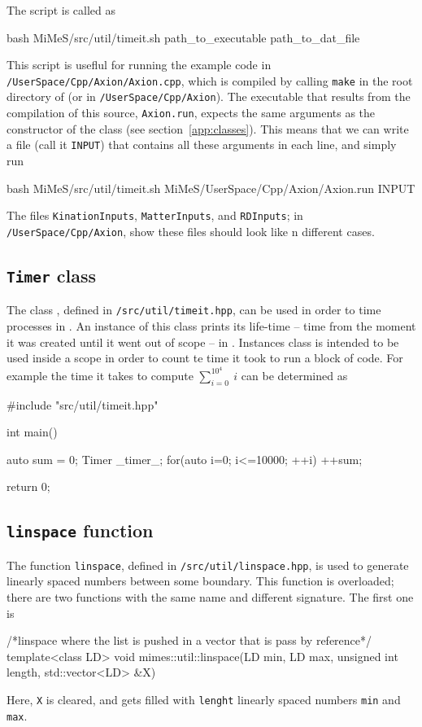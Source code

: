 \documentclass[11pt,a4paper]{article}
\begin{document}
The script is called as 
%
\begin{cpp}
	bash MiMeS/src/util/timeit.sh path_to_executable path_to_dat_file
\end{cpp}

This script is useflul for running the example code in {\tt \mimes/UserSpace/Cpp/Axion/Axion.cpp}, which is compiled by calling {\tt make} in the root directory of \mimes (or in {\tt \mimes/UserSpace/Cpp/Axion}). The executable that results from the compilation of this source, {\tt Axion.run}, expects the same arguments as the constructor of the  class (see section~\ref{app:classes}). This means that we can write a file (call it {\tt INPUT}) that contains all these arguments in each line, and simply run  
%
\begin{cpp}
	bash MiMeS/src/util/timeit.sh MiMeS/UserSpace/Cpp/Axion/Axion.run INPUT
\end{cpp}


The files {\tt KinationInputs}, {\tt MatterInputs}, and {\tt RDInputs}; in {\tt \mimes/UserSpace/Cpp/Axion}, show these files should look like n different cases.


\subsection{{\tt Timer} \CPP class}
%
The class , defined in {\tt \mimes/src/util/timeit.hpp}, can be used in order to time processes in \CPP. An instance of this class prints  its life-time -- \ie time from the moment it was created until it went out of scope -- in . Instances class is intended to be used inside a scope in order to count te time it took to run a block of code. For example the time it takes to compute  $\sum_{i=0}^{10^4} \ i$ can be determined as  
%
\begin{cpp}
	#include "src/util/timeit.hpp"
	
	int main(){
		auto sum = 0;
		{	
			Timer _timer_;
			for(auto i=0; i<=10000; ++i){ ++sum;}	
		}
	
		return 0;
	}
\end{cpp}

\subsection{{\tt linspace} function}
%
The function {\tt linspace}, defined in {\tt \mimes/src/util/linspace.hpp}, is used to generate linearly spaced numbers between some boundary. This function is overloaded; there are two functions with the same name and different signature. The first one is 
%
\begin{cpp}
    /*linspace where the list is pushed in a vector that is pass by reference*/	
	template<class LD>
	void mimes::util::linspace(LD min, LD max, unsigned int length, std::vector<LD> &X)
\end{cpp}
%
Here, {\tt X} is cleared, and gets filled with  {\tt lenght} linearly spaced numbers {\tt min} and {\tt max}.
\end{document}
